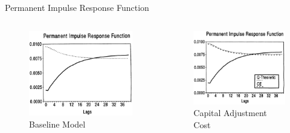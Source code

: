 \documentclass[10pt]{beamer}
\begin{document}
		      		\begin{frame}{Permanent Impulse Response Function}
		      			\begin{columns}[T,onlytextwidth]
		      				\begin{figure}
		      					\centering
		      					\includegraphics[width=\linewidth]{figures/Base_per_IRF.png}
		      					\centering\caption{Baseline Model}
		      				\end{figure}
		      				
		      				\begin{figure}
		      					\centering
		      					\includegraphics[width=\linewidth]{figures/K_per_IRF.png}
		      					\centering\caption{Capital Adjustment Cost}
		      				\end{figure}
		      				

\end{columns}
\end{frame}
\end{document}
